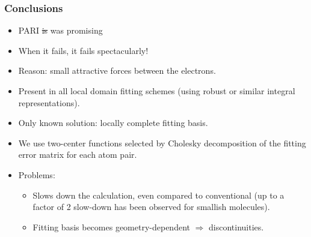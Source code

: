 \begin{frame}
   \frametitle{Conclusions}
   \begin{itemize}
      \item PARI \st{is} was promising
      \item When it fails, it fails spectacularly!
      \item Reason: small attractive forces between the electrons.
      \item Present in all local domain fitting schemes (using robust or similar integral representations).
      \item Only known solution: locally complete fitting basis.
      \item We use two-center functions selected by Cholesky decomposition of the fitting error matrix for each atom pair.
      \item Problems:
            \begin{itemize}
              \footnotesize
                 \item Slows down the calculation, even compared to conventional (up to a factor of 2 slow-down has been  observed for smallish molecules).
                 \item Fitting basis becomes geometry-dependent $\Longrightarrow$ discontinuities.
            \end{itemize}
   \end{itemize}
\end{frame}

